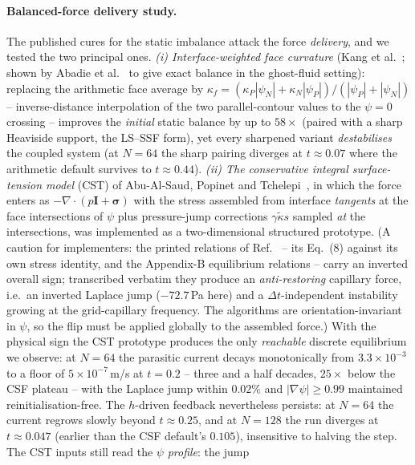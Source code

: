 \documentclass[preprint,3p,11pt]{elsarticle}
\newcommand{\psilev}{\psi}                       %
\newcommand{\gradpsi}{\lvert\nabla\psilev\rvert}
\begin{document}
\paragraph{Balanced-force delivery study.} The published cures for the static imbalance attack the
force \emph{delivery}, and we tested the two principal ones. \emph{(i) Interface-weighted face
curvature} (Kang et al.~\cite{kang2000}; shown by Abadie et al.~\cite{abadie2015} to give exact
balance in the ghost-fluid setting): replacing the arithmetic face average by
$\kappa_f=(\kappa_P|\psilev_N|+\kappa_N|\psilev_P|)/(|\psilev_P|+|\psilev_N|)$ -- inverse-distance
interpolation of the two parallel-contour values to the $\psilev=0$ crossing -- improves the
\emph{initial} static balance by up to $58\times$ (paired with a sharp Heaviside support, the LS--SSF
form), yet every sharpened variant \emph{destabilises} the coupled system (at $N{=}64$ the sharp
pairing diverges at $t\approx0.07$ where the arithmetic default survives to $t\approx0.44$).
\emph{(ii) The conservative integral surface-tension model} (CST) of Abu-Al-Saud, Popinet and
Tchelepi~\cite{abualsaud2018}, in which the force enters as $-\nabla\cdot(p\mathbf{I}+\bm{\sigma})$
with the stress assembled from interface \emph{tangents} at the face intersections of $\psilev$ plus
pressure-jump corrections $\gamma\tilde\kappa s$ sampled \emph{at} the intersections, was implemented
as a two-dimensional structured prototype. (A caution for implementers: the printed relations of
Ref.~\cite{abualsaud2018} -- its Eq.~(8) against its own stress identity, and the Appendix-B
equilibrium relations -- carry an inverted overall sign; transcribed verbatim they produce an
\emph{anti-restoring} capillary force, i.e.\ an inverted Laplace jump ($-72.7$\,Pa here) and a
$\Delta t$-independent instability growing at the grid-capillary frequency. The algorithms are
orientation-invariant in $\psilev$, so the flip must be applied globally to the assembled force.)
With the physical sign the CST prototype produces the only \emph{reachable} discrete equilibrium we
observe: at $N{=}64$ the parasitic current decays monotonically from $3.3\times10^{-3}$ to a floor of
$5\times10^{-7}$\,m/s at $t{=}0.2$ -- three and a half decades, $25\times$ below the CSF plateau --
with the Laplace jump within $0.02\%$ and $\gradpsi\geq0.99$ maintained reinitialisation-free. The
$h$-driven feedback nevertheless persists: at $N{=}64$ the current regrows slowly beyond $t\approx
0.25$, and at $N{=}128$ the run diverges at $t\approx0.047$ (earlier than the CSF default's $0.105$),
insensitive to halving the step. The CST inputs still read the $\psilev$ \emph{profile}: the jump
\end{document}
